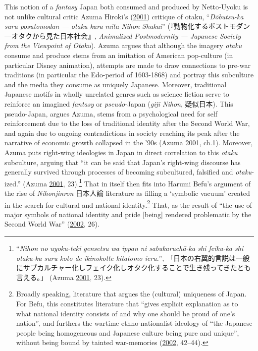 \documentclass[10pt,british,A4paper,oneside]{memoir}
\begin{document}
This notion of a \emph{fantasy} Japan both consumed and produced by
Netto-Uyoku is not unlike cultural critic Azuma Hiroki's
(\protect\hyperlink{ref-azuma_otaku:_2001}{2001}) critique of otaku,
``\emph{Dōbutsu-ka suru posutomodan --- otaku kara mita Nihon Shakai}''
(『動物化するポストモダン---オタクから見た日本社会』, \emph{Animalized
Postmodernity --- Japanese Society from the Viewpoint of Otaku}). Azuma
argues that although the imagery \emph{otaku} consume and produce stems
from an imitation of American pop-culture (in particular Disney
animation), attempts are made to draw connections to pre-war traditions
(in particular the Edo-period of 1603-1868) and portray this subculture
and the media they consume as uniquely Japanese. Moreover, traditional
Japanese motifs in wholly unrelated genres such as science fiction serve
to reinforce an imagined \emph{fantasy} or \emph{pseudo}-Japan
(\emph{giji Nihon}, 疑似日本). This pseudo-Japan, argues Azuma, stems from a psychological need for
self reinforcement due to the loss of traditional identity after the
Second World War, and again due to ongoing contradictions in society
reaching its peak after the narrative of economic growth collapsed in
the '90s (Azuma \protect\hyperlink{ref-azuma_otaku:_2001}{2001}, ch.1).
Moreover, Azuma puts right-wing ideologies in Japan in direct
correlation to this \emph{otaku} subculture, arguing that ``it can be
said that Japan's right-wing discourse has generally survived through
processes of becoming subcultured, falsified and \emph{otaku}-ized.''
(Azuma \protect\hyperlink{ref-azuma_otaku:_2001}{2001}, 23).\footnote{``\emph{Nihon
  no uyoku-teki gensetsu wa ippan ni sabukaruchā-ka shi feiku-ka shi
  otaku-ka suru koto de ikinokotte kitatomo ieru.}'',
  「日本の右翼的言説は一般にサブカルチャー化しフェイク化しオタク化することで生き残ってきたとも言える。」
  (Azuma \protect\hyperlink{ref-azuma_otaku:_2001}{2001}, 23).} That in itself
then fits into Harumi Befu's argument of the rise of \emph{Nihonjinron}
日本人論 literature as filling a `symbolic vacuum' created in the search
for cultural and national identity.\footnote{Broadly speaking,
  literature that argues the (cultural) uniqueness of Japan. For Befu,
  this constitutes literature that ``gives explicit explanation as to
  what national identity consists of and why one should be proud of
  one's nation'', and furthers the wartime ethno-nationalist ideology of
  ``the Japanese people being homogeneous and Japanese culture being
  pure and unique'', without being bound by tainted war-memories
  (\protect\hyperlink{ref-befu_symbols_2002}{2002}, 42--44).} That, as
the result of ``the use of major symbols of national identity and pride
{[}being{]} rendered problematic by the Second World War''
(\protect\hyperlink{ref-befu_symbols_2002}{2002}, 26).
\end{document}
